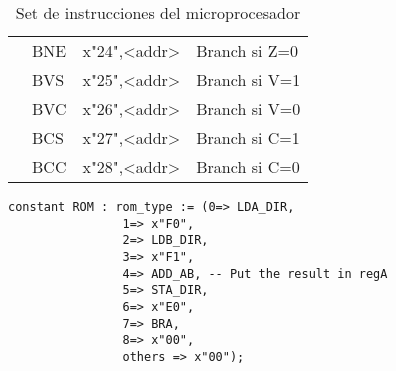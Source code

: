 \documentclass[a4paper,twoside]{article}
\begin{document}
\begin{table}[h!]
\begin{tabular}{|l|l|l|l|}
																	   & BNE  & x"24",<addr> & Branch si Z=0 \\ \cline{2-4}
																		 & BVS  & x"25",<addr> & Branch si V=1 \\ \cline{2-4}
																		 & BVC  & x"26",<addr> & Branch si V=0 \\ \cline{2-4}
																		 & BCS  & x"27",<addr> & Branch si C=1 \\ \cline{2-4}
																	   & BCC  & x"28",<addr> & Branch si C=0 \\ \cline{2-4}
																		 	\hline
    \end{tabular}    \caption{Set de instrucciones del microprocesador}
    \end{table}

\begin{verbatim}
constant ROM : rom_type := (0=> LDA_DIR,
			    1=> x"F0",
			    2=> LDB_DIR,
			    3=> x"F1",
			    4=> ADD_AB, -- Put the result in regA
			    5=> STA_DIR,
			    6=> x"E0",
			    7=> BRA,
			    8=> x"00",
			    others => x"00");
\end{verbatim}
\end{document}
